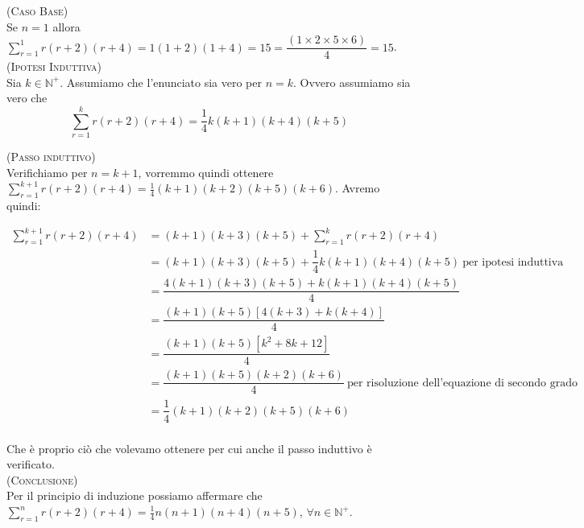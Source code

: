 \begin{soluzione}
    

\textsc{(Caso Base)}\\
Se $n = 1$ allora $\sum\limits_{r=1}^{1} r(r+2)(r+4) = 1(1+2)(1+4) = 15 = \dfrac{(1\times 2 \times 5 \times 6)}{4} = 15$. \\

		
\textsc{(Ipotesi Induttiva)}\\
Sia $k \in \mathbb{N}^+$.  Assumiamo che l'enunciato sia vero per $n = k$. Ovvero assumiamo sia vero che $$\sum\limits_{r=1}^{k} r(r+2)(r+4) = \dfrac{1}{4}k(k+1)(k+4)(k+5)$$
		
\textsc{(Passo induttivo)}\\
Verifichiamo per $n = k+1$, vorremmo quindi ottenere $\sum\limits_{r=1}^{k+1} r(r+2)(r+4) = \frac{1}{4}(k+1)(k+2)(k+5)(k+6)$. Avremo quindi:

\begin{align*}
\sum\limits_{r=1}^{k+1} r(r+2)(r+4) &= (k+1)(k+3)(k+5)+\sum\limits_{r=1}^{k} r(r+2)(r+4)\\
&= (k+1)(k+3)(k+5)+\dfrac{1}{4}k(k+1)(k+4)(k+5)\ \text{per ipotesi induttiva}\\
&= \dfrac{4(k+1)(k+3)(k+5)+k(k+1)(k+4)(k+5)}{4}\\
&= \dfrac{(k+1)(k+5)[4(k+3)+k(k+4)]}{4}\\
&= \dfrac{(k+1)(k+5)[k^2+8k+12]}{4}\\
&= \dfrac{(k+1)(k+5)(k+2)(k+6)}{4}\ \text{per risoluzione dell'equazione di secondo grado}\\
&= \dfrac{1}{4}(k+1)(k+2)(k+5)(k+6)\\
\end{align*}

Che è proprio ciò che volevamo ottenere per cui anche il passo induttivo è verificato.\\

\textsc{(Conclusione)}\\
Per il principio di induzione possiamo affermare che $\sum\limits_{r=1}^{n} r(r+2)(r+4) = \frac{1}{4}n(n+1)(n+4)(n+5)$, $\forall n \in \mathbb{N}^+$. \\
\end{soluzione}


